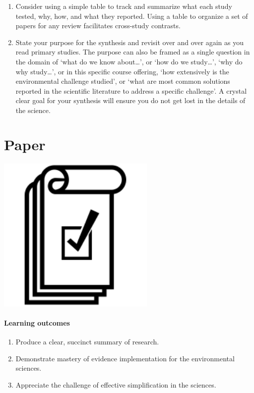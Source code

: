 \documentclass[
]{book}
\providecommand{\tightlist}{%
  \setlength{\itemsep}{0pt}\setlength{\parskip}{0pt}}
\begin{document}
\begin{enumerate}
\item
  Consider using a simple table to track and summarize what each study tested, why, how, and what they reported. Using a table to organize a set of papers for any review facilitates cross-study contrasts.\\
\item
  State your purpose for the synthesis and revisit over and over again as you read primary studies. The purpose can also be framed as a single question in the domain of `what do we know about\ldots{}', or `how do we study\ldots{}', `why do why study\ldots{}', or in this specific course offering, `how extensively is the environmental challenge studied', or `what are most common solutions reported in the scientific literature to address a specific challenge'. A crystal clear goal for your synthesis will ensure you do not get lost in the details of the science.
\end{enumerate}

\hypertarget{paper}{%
\chapter{Paper}\label{paper}}

\includegraphics[width=3in,height=\textheight]{./paper.png}

\hypertarget{learning-outcomes-10}{%
\subsubsection*{Learning outcomes}\label{learning-outcomes-10}}

\begin{enumerate}
\def\labelenumi{\arabic{enumi}.}
\tightlist
\item
  Produce a clear, succinct summary of research.\\
\item
  Demonstrate mastery of evidence implementation for the environmental sciences.\\
\item
  Appreciate the challenge of effective simplification in the sciences.
\end{enumerate}
\end{document}
